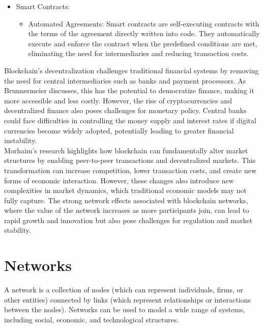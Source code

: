 \begin{itemize}
\begin{itemize}
        \end{itemize}
    \item Smart Contracts:
        \begin{itemize}
            \item Automated Agreements: Smart contracts are self-executing contracts with the terms of the agreement directly written into code. They automatically execute and enforce the contract when the predefined conditions are met, eliminating the need for intermediaries and reducing transaction costs.
        \end{itemize}
\end{itemize}

Blockchain's decentralization challenges traditional financial systems by removing the need for central intermediaries such as banks and payment processors. As Brunnermeier discusses, this has the potential to democratize finance, making it more accessible and less costly. However, the rise of cryptocurrencies and decentralized finance also poses challenges for monetary policy. Central banks could face difficulties in controlling the money supply and interest rates if digital currencies become widely adopted, potentially leading to greater financial instability.
 \\

Morhaim’s research highlights how blockchain can fundamentally alter market structures by enabling peer-to-peer transactions and decentralized markets. This transformation can increase competition, lower transaction costs, and create new forms of economic interaction. However, these changes also introduce new complexities in market dynamics, which traditional economic models may not fully capture. The strong network effects associated with blockchain networks, where the value of the network increases as more participants join, can lead to rapid growth and innovation but also pose challenges for regulation and market stability.
\\



\section{Networks}\label{cTGE}
A network is a collection of nodes (which can represent individuals, firms, or other entities) connected by links (which represent relationships or interactions between the nodes). Networks can be used to model a wide range of systems, including social, economic, and technological structures. \\

